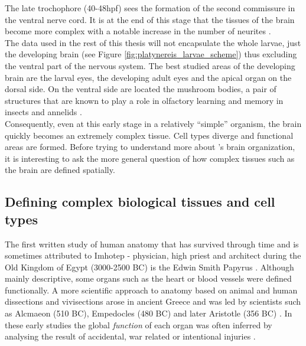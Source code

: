      The late trochophore (40-48hpf) sees the formation of the second commissure in the ventral nerve cord. It is at the end of this stage that the tissues of the brain become more complex with a notable increase in the number of neurites \citep{Fischer10}.\\
     
     The data used in the rest of this thesis will not encapsulate the whole larvae, just the developing brain (see Figure \ref{fig:platynereis_larvae_scheme}) thus excluding the ventral part of the nervous system. The best studied areas of the developing brain are the larval eyes, the developing adult eyes and the apical organ on the dorsal side. On the ventral side are located the mushroom bodies, a pair of structures that are known to play a role in olfactory learning and memory in insects and annelids \citep{Tomer10}.\\
     
     Consequently, even at this early stage in a relatively ``simple'' organism, the brain quickly becomes an extremely complex tissue. Cell types diverge and functional areas are formed. Before trying to understand more about \platy{}'s brain organization, it is interesting to ask the more general question of how complex tissues such as the brain are defined spatially.
     
     
     \subsection{Defining complex biological tissues and cell types}
	
    The first written study of human anatomy that has survived through time and is sometimes attributed to Imhotep - physician, high priest and architect during the Old Kingdom of Egypt (3000-2500 BC) is the Edwin Smith Papyrus \citep{goodwin98,breasted30}. Although mainly descriptive, some organs such as the heart or blood vessels were defined functionally. A more scientific approach to anatomy based on animal and human dissections and vivisections arose in ancient Greece and was led by scientists such as Alcmaeon (510 BC),  Empedocles (480 BC) and later Aristotle (356 BC) \citep{singer57}. In these early studies the global \emph{function} of each organ was often inferred by analysing the result of accidental, war related or intentional injuries \citep{singer57}.\\ 
    
